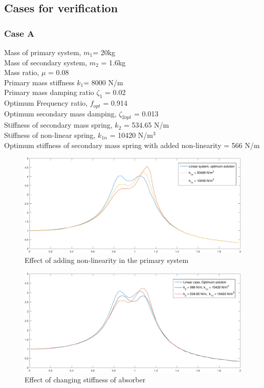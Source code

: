 \subsection{Cases for verification}
\subsubsection{Case A}
Mass of primary system, $m_1$= 20kg\\
Mass of secondary system, $m_2$ = 1.6kg\\
Mass ratio, $\mu$ = 0.08\\
Primary mass stiffness $k_1$= 8000 N/m\\
Primary mass damping ratio $\zeta_1$ = 0.02\\
Optimum Frequency ratio, $f_{opt}$ = 0.914\\
Optimum secondary mass damping, $\zeta_{2opt}$ = 0.013\\
Stiffness of secondary mass spring, $k_2$ = 534.65 N/m \\
Stiffness of non-linear spring, $k_{1n}$ = 10420 N/m$^3$\\
Optimum stiffness of secondary mass spring with added non-linearity = 566 N/m
\begin{figure}[h!]
\includegraphics[width=\textwidth, height = 0.5\textwidth]{"figures/2addingNonlinearity"}
\caption{Effect of adding non-linearity in the primary system}
\end{figure}

\begin{figure}[h!]
\includegraphics[width=\textwidth, height = 0.5\textwidth]{"figures/2changingk2"}
\caption{Effect of changing stiffness of absorber}
\end{figure}


